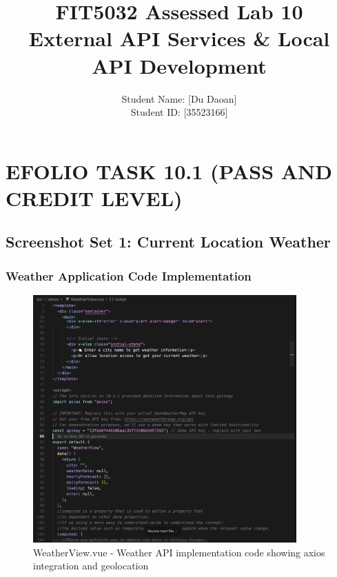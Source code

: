 \documentclass[12pt,a4paper]{article}
\title{FIT5032 Assessed Lab 10\\
External API Services \& Local API Development}
\author{Student Name: [Du Daoan]\\
Student ID: [35523166]}
\date{}
\begin{document}
\maketitle

\tableofcontents
\newpage

\section{EFOLIO TASK 10.1 (PASS AND CREDIT LEVEL)}

\subsection{Screenshot Set 1: Current Location Weather}

\subsubsection{Weather Application Code Implementation}
\begin{figure}[H]
\centering
\includegraphics[width=0.9\textwidth]{weather_code_implementation.png}
\caption{WeatherView.vue - Weather API implementation code showing axios integration and geolocation}
\end{figure}
\end{document}
